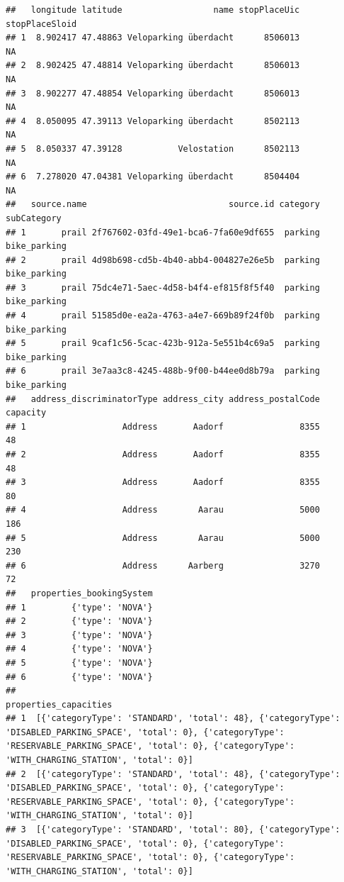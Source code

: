 \documentclass[
]{book}
\begin{document}
\begin{verbatim}
##   longitude latitude                  name stopPlaceUic stopPlaceSloid
## 1  8.902417 47.48863 Veloparking überdacht      8506013             NA
## 2  8.902425 47.48814 Veloparking überdacht      8506013             NA
## 3  8.902277 47.48854 Veloparking überdacht      8506013             NA
## 4  8.050095 47.39113 Veloparking überdacht      8502113             NA
## 5  8.050337 47.39128           Velostation      8502113             NA
## 6  7.278020 47.04381 Veloparking überdacht      8504404             NA
##   source.name                            source.id category  subCategory
## 1       prail 2f767602-03fd-49e1-bca6-7fa60e9df655  parking bike_parking
## 2       prail 4d98b698-cd5b-4b40-abb4-004827e26e5b  parking bike_parking
## 3       prail 75dc4e71-5aec-4d58-b4f4-ef815f8f5f40  parking bike_parking
## 4       prail 51585d0e-ea2a-4763-a4e7-669b89f24f0b  parking bike_parking
## 5       prail 9caf1c56-5cac-423b-912a-5e551b4c69a5  parking bike_parking
## 6       prail 3e7aa3c8-4245-488b-9f00-b44ee0d8b79a  parking bike_parking
##   address_discriminatorType address_city address_postalCode capacity
## 1                   Address       Aadorf               8355       48
## 2                   Address       Aadorf               8355       48
## 3                   Address       Aadorf               8355       80
## 4                   Address        Aarau               5000      186
## 5                   Address        Aarau               5000      230
## 6                   Address      Aarberg               3270       72
##   properties_bookingSystem
## 1         {'type': 'NOVA'}
## 2         {'type': 'NOVA'}
## 3         {'type': 'NOVA'}
## 4         {'type': 'NOVA'}
## 5         {'type': 'NOVA'}
## 6         {'type': 'NOVA'}
##                                                                                                                                                                                                   properties_capacities
## 1  [{'categoryType': 'STANDARD', 'total': 48}, {'categoryType': 'DISABLED_PARKING_SPACE', 'total': 0}, {'categoryType': 'RESERVABLE_PARKING_SPACE', 'total': 0}, {'categoryType': 'WITH_CHARGING_STATION', 'total': 0}]
## 2  [{'categoryType': 'STANDARD', 'total': 48}, {'categoryType': 'DISABLED_PARKING_SPACE', 'total': 0}, {'categoryType': 'RESERVABLE_PARKING_SPACE', 'total': 0}, {'categoryType': 'WITH_CHARGING_STATION', 'total': 0}]
## 3  [{'categoryType': 'STANDARD', 'total': 80}, {'categoryType': 'DISABLED_PARKING_SPACE', 'total': 0}, {'categoryType': 'RESERVABLE_PARKING_SPACE', 'total': 0}, {'categoryType': 'WITH_CHARGING_STATION', 'total': 0}]

\end{verbatim}
\end{document}
